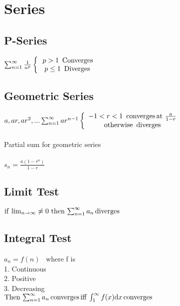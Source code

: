\documentclass[11pt]{article} %
\begin{document}
\section{Series}
\subsection{P-Series}
\begin{math}
\sum_{n=1}^{\infty}\frac{1}{n^{p}} 
\left\{
\begin{array}{c l}     
    \, p>1 \,\,\, \mathrm{Converges} \\
    p\leq 1 \,\,\, \mathrm{Diverges}
\end{array}\right. \\
\end{math}
\subsection{Geometric Series}
\begin{math}
a,ar,ar^{2},... \sum_{n=1}^{\infty}ar^{n-1} 
\left\{
\begin{array}{c l}     
    -1<r<1 \,\,\, \mathrm{converges\, at} \,\, \frac{a}{1-r} \\
    \mathrm{otherwise} \,\,\, \mathrm{diverges} 
\end{array}\right. \\
\end{math} \\
\\
Partial sum for geometric series\\
\\
\begin{math}
s_{n}=\frac{a(1-r^{n})}{1-r}
\end{math}
\subsection{Limit Test}
\begin{math}
\mathrm{if}\, \lim_{n\to \infty}\neq 0 \,\, \mathrm{then} \, \sum_{n=1}^{\infty}a_{n} \, \mathrm{diverges} \\
\end{math}
\subsection{Integral Test}
\begin{math}
a_{n} = f(n)
\end{math}
\, where f is \\
1. Continuous \\
2. Positive \\
3. Decreasing \\
\begin{math}
\mathrm{Then} \, \sum_{n=1}^{\infty}a_{n} \, \mathrm{converges\, iff} \, \int_{1}^{\infty}f(x)\mathrm{d}x \, \mathrm{converges} \\
\end{math}
\end{document}
